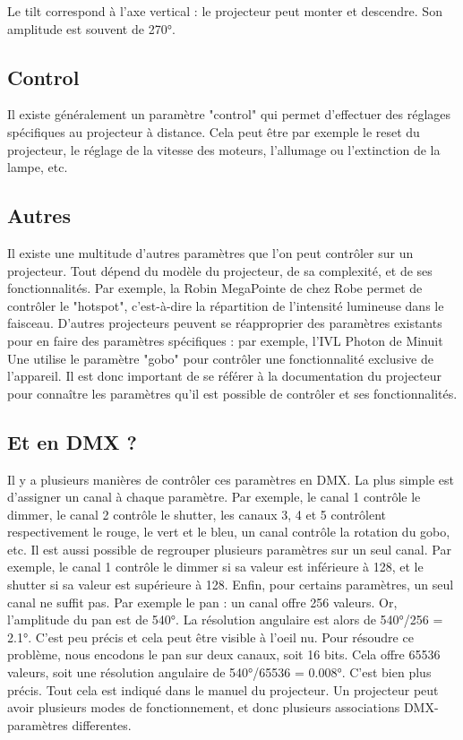 Le tilt correspond à l'axe vertical : le projecteur peut monter et descendre. Son amplitude est souvent de 270°.

\subsection{Control}
\label{subsec:param_control}

Il existe généralement un paramètre "control" qui permet d'effectuer des réglages spécifiques au projecteur à distance. Cela peut être par exemple le reset du projecteur, le réglage de la vitesse des moteurs, l'allumage ou l'extinction de la lampe, etc.

\subsection{Autres}
\label{subsec:param_autres}

Il existe une multitude d'autres paramètres que l'on peut contrôler sur un projecteur. Tout dépend du modèle du projecteur, de sa complexité, et de ses fonctionnalités.
Par exemple, la Robin MegaPointe de chez Robe permet de contrôler le "hotspot", c'est-à-dire la répartition de l'intensité lumineuse dans le faisceau.
D'autres projecteurs peuvent se réapproprier des paramètres existants pour en faire des paramètres spécifiques : par exemple, l'IVL Photon de Minuit Une utilise le paramètre "gobo" pour contrôler une fonctionnalité exclusive de l'appareil.
\newline
Il est donc important de se référer à la documentation du projecteur pour connaître les paramètres qu'il est possible de contrôler et ses fonctionnalités.

\subsection{Et en DMX ?}
\label{subsec:param_dmx}

Il y a plusieurs manières de contrôler ces paramètres en DMX.
\newline
La plus simple est d'assigner un canal à chaque paramètre. Par exemple, le canal 1 contrôle le dimmer, le canal 2 contrôle le shutter, les canaux 3, 4 et 5 contrôlent respectivement le rouge, le vert et le bleu, un canal contrôle la rotation du gobo, etc.
\newline
Il est aussi possible de regrouper plusieurs paramètres sur un seul canal. Par exemple, le canal 1 contrôle le dimmer si sa valeur est inférieure à 128, et le shutter si sa valeur est supérieure à 128.
\newline
Enfin, pour certains paramètres, un seul canal ne suffit pas. Par exemple le pan : un canal offre 256 valeurs. Or, l'amplitude du pan est de 540°. La résolution angulaire est alors de 540°/256 = 2.1°. C'est peu précis et cela peut être visible à l'oeil nu.
Pour résoudre ce problème, nous encodons le pan sur deux canaux, soit 16 bits. Cela offre 65536 valeurs, soit une résolution angulaire de 540°/65536 = 0.008°. C'est bien plus précis.
\newline
\newline
Tout cela est indiqué dans le manuel du projecteur. Un projecteur peut avoir plusieurs modes de fonctionnement, et donc plusieurs associations DMX-paramètres differentes.
